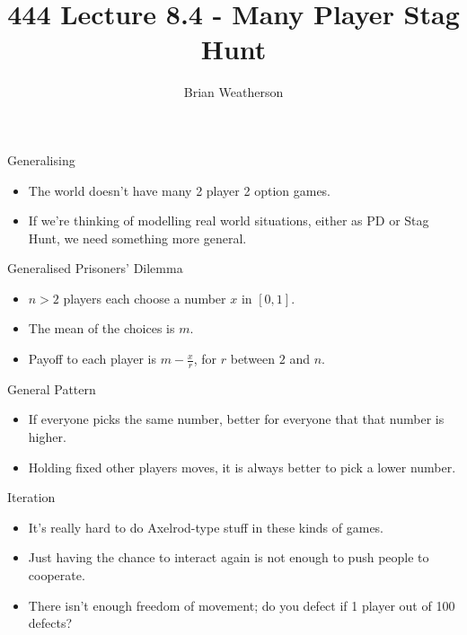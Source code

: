 \documentclass[
  ignorenonframetext,
]{beamer}
\title{444 Lecture 8.4 - Many Player Stag Hunt}
\author{Brian Weatherson}
\date{}
\providecommand{\tightlist}{%
  \setlength{\itemsep}{0pt}\setlength{\parskip}{0pt}}
\begin{document}
\frame{\titlepage}

\begin{frame}{Generalising}
\protect\hypertarget{generalising}{}
\begin{itemize}
\tightlist
\item
  The world doesn't have many 2 player 2 option games.
\item
  If we're thinking of modelling real world situations, either as PD or
  Stag Hunt, we need something more general.
\end{itemize}
\end{frame}

\begin{frame}{Generalised Prisoners' Dilemma}
\protect\hypertarget{generalised-prisoners-dilemma}{}
\begin{itemize}
\tightlist
\item
  \(n > 2\) players each choose a number \(x\) in \([0, 1]\).
\item
  The mean of the choices is \(m\).
\item
  Payoff to each player is \(m - \frac{x}{r}\), for \(r\) between \(2\)
  and \(n\).
\end{itemize}
\end{frame}

\begin{frame}{General Pattern}
\protect\hypertarget{general-pattern}{}
\begin{itemize}
\tightlist
\item
  If everyone picks the same number, better for everyone that that
  number is higher. \pause
\item
  Holding fixed other players moves, it is always better to pick a lower
  number.
\end{itemize}
\end{frame}

\begin{frame}{Iteration}
\protect\hypertarget{iteration}{}
\begin{itemize}
\tightlist
\item
  It's really hard to do Axelrod-type stuff in these kinds of games.
\item
  Just having the chance to interact again is not enough to push people
  to cooperate.
\item
  There isn't enough freedom of movement; do you defect if 1 player out
  of 100 defects?
\end{itemize}
\end{frame}
\end{document}

